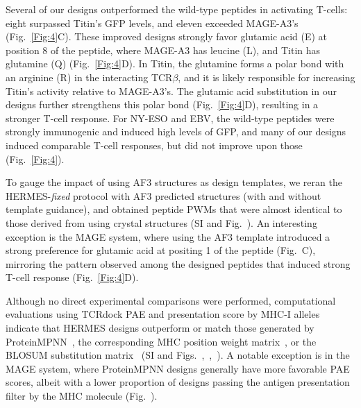 {Several} of our designs outperformed the wild-type peptides in activating T-cells: eight surpassed
Titin's GFP levels, and eleven exceeded MAGE-A3's (Fig.~\ref{Fig:4}C). These improved designs
strongly favor glutamic acid (E) at position 8 of the peptide, where MAGE-A3 has leucine (L), and
Titin has glutamine (Q) (Fig.~\ref{Fig:4}D). In Titin, the glutamine forms a polar bond with an
arginine (R) in the interacting TCR$\beta$, and it is likely responsible for increasing Titin's
activity relative to MAGE-A3's. The glutamic acid substitution in our designs further strengthens
this polar bond (Fig.~\ref{Fig:4}D), resulting in a stronger T-cell response. {For NY-ESO and EBV,
the wild-type peptides were strongly immunogenic and induced high levels of GFP, and many of our
designs induced comparable T-cell responses, but did not improve upon those (Fig.~\ref{Fig:4})}.


{To gauge the impact of using AF3 structures as design templates, we reran the HERMES-{\em fixed}
protocol with AF3 predicted structures (with and without template guidance), and obtained peptide
PWMs that were almost identical to those derived from using crystal structures (SI and
Fig.~\DesignPWMsWithAf). An interesting exception is the MAGE system, where using the AF3 template
introduced a strong preference for glutamic acid at positing 1 of the peptide
(Fig.~\DesignPWMsWithAf C), mirroring the pattern observed among the designed peptides that induced
strong T-cell response (Fig.~\ref{Fig:4}D).}

Although no direct experimental comparisons were performed, computational evaluations using TCRdock
PAE and presentation score by MHC-I alleles indicate that HERMES designs outperform or match those
generated by ProteinMPNN~\cite{Dauparas2022-fu}, the corresponding MHC position weight
matrix~\cite{Lundegaard2008-ao, Lundegaard2008-wz, Andreatta2016-uh,Tadros2023-ij}, or the BLOSUM
substitution matrix~\cite{Henikoff1992-jq} (SI and
Figs.~\DesignTcrdockNyesoFigure,~\DesignTcrdockEbvFigure,~\DesignTcrdockMageFigure). A notable
exception is in the MAGE system, where ProteinMPNN designs generally have more favorable PAE scores,
albeit with a lower proportion of designs passing the antigen presentation filter by the MHC
molecule (Fig.~\DesignTcrdockMageFigure).

